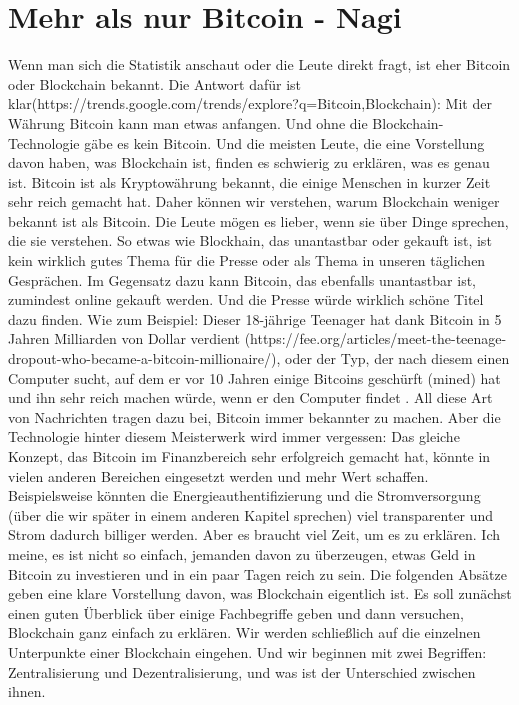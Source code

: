 \section{Mehr als nur Bitcoin - Nagi}
Wenn man sich die Statistik anschaut oder die Leute direkt fragt, ist eher Bitcoin oder Blockchain bekannt. Die Antwort dafür ist klar(https://trends.google.com/trends/explore?q=Bitcoin,Blockchain): Mit der Währung Bitcoin kann man etwas anfangen. Und ohne die Blockchain-Technologie gäbe es kein Bitcoin. Und die meisten Leute, die eine Vorstellung davon haben, was Blockchain ist, finden es schwierig zu erklären, was es genau ist. Bitcoin ist als Kryptowährung bekannt, die einige Menschen in kurzer Zeit sehr reich gemacht hat. Daher können wir verstehen, warum Blockchain weniger bekannt ist als Bitcoin.
\newline
Die Leute mögen es lieber, wenn sie über Dinge sprechen, die sie verstehen. So etwas wie Blockhain, das unantastbar oder gekauft ist, ist kein wirklich gutes Thema für die Presse oder als Thema in unseren täglichen Gesprächen. Im Gegensatz dazu kann Bitcoin, das ebenfalls unantastbar ist, zumindest online gekauft werden. Und die Presse würde wirklich schöne Titel dazu finden. Wie zum Beispiel: Dieser 18-jährige Teenager hat dank Bitcoin in 5 Jahren Milliarden von Dollar verdient (https://fee.org/articles/meet-the-teenage-dropout-who-became-a-bitcoin-millionaire/), oder der Typ, der nach diesem einen Computer sucht, auf dem er vor 10 Jahren einige Bitcoins geschürft (mined) hat und ihn sehr reich machen würde, wenn er den Computer findet .
\newline
All diese Art von Nachrichten tragen dazu bei, Bitcoin immer bekannter zu machen. Aber die Technologie hinter diesem Meisterwerk wird immer vergessen: Das gleiche Konzept, das Bitcoin im Finanzbereich sehr erfolgreich gemacht hat, könnte in vielen anderen Bereichen eingesetzt werden und mehr Wert schaffen. Beispielsweise könnten die Energieauthentifizierung und die Stromversorgung (über die wir später in einem anderen Kapitel sprechen) viel transparenter und Strom dadurch billiger werden. Aber es braucht viel Zeit, um es zu erklären. Ich meine, es ist nicht so einfach, jemanden davon zu überzeugen, etwas Geld in Bitcoin zu investieren und in ein paar Tagen reich zu sein.
\newline
Die folgenden Absätze geben eine klare Vorstellung davon, was Blockchain eigentlich ist. Es soll zunächst einen guten Überblick über einige Fachbegriffe geben und dann versuchen, Blockchain ganz einfach zu erklären. Wir werden schließlich auf die einzelnen Unterpunkte einer Blockchain eingehen. Und wir beginnen mit zwei Begriffen: Zentralisierung und Dezentralisierung, und was ist der Unterschied zwischen ihnen. 
